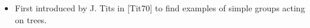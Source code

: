 \documentclass[preview]{standalone}
\begin{document}
\begin{center}
\begin{itemize} \item First introduced by J. Tits in [Tit70] to find examples of simple groups acting on trees.\end{itemize}
\end{center}
\end{document}

